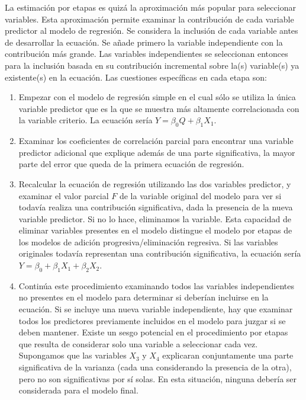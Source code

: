 \documentclass[
  12pt,
]{krantz}
\theoremstyle{definition}
\theoremstyle{definition}
\theoremstyle{definition}
\theoremstyle{remark}
\begin{document}
La estimación por etapas es quizá la aproximación más popular para seleccionar variables. Esta aproximación permite examinar la contribución de cada variable predictor al modelo de regresión. Se considera la inclusión de cada variable antes de desarrollar la ecuación. Se añade primero la variable independiente con la contribución más grande. Las variables independientes se seleccionan entonces para la inclusión basada en su contribución incremental sobre la(s) variable(s) ya existente(s) en la ecuación. Las cuestiones específicas en cada etapa son:

\begin{enumerate}
\def\labelenumi{\arabic{enumi}.}
\item
  Empezar con el modelo de regresión simple en el cual sólo se utiliza la única variable predictor que es la que se muestra más altamente correlacionada con la variable criterio. La ecuación sería \(Y= \beta_0 Q + \beta_1X_1\).
\item
  Examinar los coeficientes de correlación parcial para encontrar una variable predictor adicional que explique además de una parte significativa, la mayor parte del error que queda de la primera ecuación de regresión.
\item
  Recalcular la ecuación de regresión utilizando las dos variables predictor, y examinar el valor parcial \(F\) de la variable original del modelo para ver si todavía realiza una contribución significativa, dada la presencia de la nueva variable predictor. Si no lo hace, eliminamos la variable. Esta capacidad de eliminar variables presentes en el modelo distingue el modelo por etapas de los modelos de adición progresiva/eliminación regresiva. Si las variables originales todavía representan una contribución significativa, la ecuación sería \(Y = \beta_0 + \beta_1X_1 + \beta_2X_2\).
\item
  Continúa este procedimiento examinando todos las variables independientes no presentes en el modelo para determinar si deberían incluirse en la ecuación. Si se incluye una nueva variable independiente, hay que examinar todos los predictores previamente incluidos en el modelo para juzgar si se deben mantener. Existe un sesgo potencial en el procedimiento por etapas que resulta de considerar solo una variable a seleccionar cada vez. Supongamos que las variables \(X_3\) y \(X_4\) explicaran conjuntamente una parte significativa de la varianza (cada una considerando la presencia de la otra), pero no son significativas por sí solas. En esta situación, ninguna debería ser considerada para el modelo final.
\end{enumerate}
\end{document}
